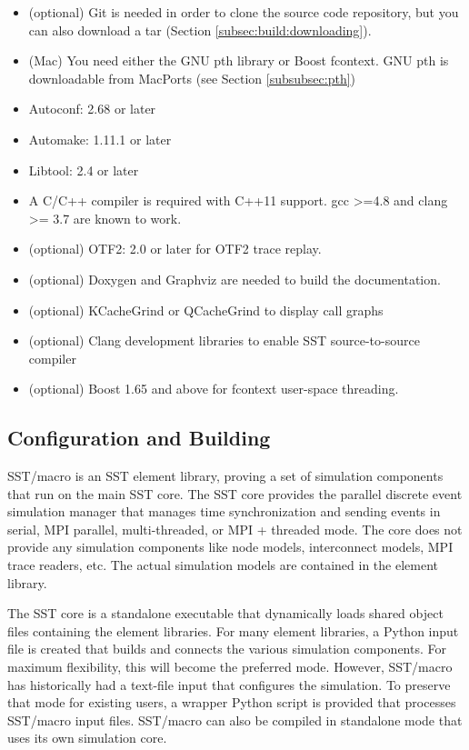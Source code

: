 \begin{itemize}
\item (optional) Git is needed in order to clone the source code repository, but you can also download a tar (Section \ref{subsec:build:downloading}).
\item (Mac) You need either the GNU pth library or Boost fcontext. GNU pth is downloadable from MacPorts (see Section \ref{subsubsec:pth})
\item Autoconf: 2.68 or later 
\item Automake: 1.11.1 or later 
\item Libtool: 2.4 or later 
\item A C/C++ compiler is required with C++11 support.  gcc >=4.8 and clang >= 3.7 are known to work.
\item (optional) OTF2: 2.0 or later for OTF2 trace replay.
\item (optional) Doxygen and Graphviz are needed to build the documentation.
\item (optional) KCacheGrind or QCacheGrind to display call graphs
\item (optional) Clang development libraries to enable SST source-to-source compiler
\item (optional) Boost 1.65 and above for fcontext user-space threading.
\end{itemize}

\subsection{Configuration and Building}
\label{subsec:build:configure}

SST/macro is an SST element library, proving a set of simulation components that run on the main SST core.  
The SST core provides the parallel discrete event simulation manager that manages time synchronization and sending events in serial, MPI parallel, multi-threaded, or MPI + threaded mode.  
The core does not provide any simulation components like node models, interconnect models, MPI trace readers, etc.  
The actual simulation models are contained in the element library.  

The SST core is a standalone executable that dynamically loads shared object files containing the element libraries.  
For many element libraries, a Python input file is created that builds and connects the various simulation components.  
For maximum flexibility, this will become the preferred mode.  
However, SST/macro has historically had a text-file input  that configures the simulation.  
To preserve that mode for existing users, a wrapper Python script is provided that processes SST/macro input files.  
SST/macro can also be compiled in standalone mode that uses its own simulation core.

